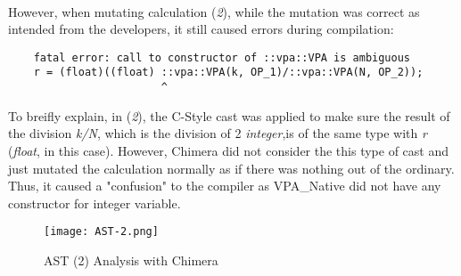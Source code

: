 ~\\
However, when mutating calculation (\textit{2}), while the mutation was correct as intended from the developers, it still caused errors during compilation:
\begin{verbatim}
	fatal error: call to constructor of ::vpa::VPA is ambiguous
	r = (float)((float) ::vpa::VPA(k, OP_1)/::vpa::VPA(N, OP_2));
						^
\end{verbatim}
To breifly explain, in (\textit{2}), the C-Style cast was applied to make sure the result of the division \textit{k/N}, which is the division of 2 \textit{integer},is of the same type with \textit{r} (\textit{float}, in this case). However, Chimera did not consider the this type of cast and just mutated the calculation normally as if there was nothing out of the ordinary. Thus, it caused a "confusion" to the compiler as VPA\_Native did not have any constructor for integer variable. \\
\begin{figure}[H]
\texttt{[image: AST-2.png]}
\centering
\caption{AST (2) Analysis with Chimera}
\end{figure}

